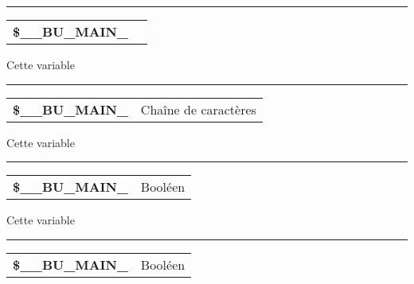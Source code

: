 \documentclass[a4paper,10pt]{article}
\begin{document}

\par\noindent\rule{\textwidth}{0.4pt}

\begin{justify}
    \begin{tabular}{l|l}
        \textbf{\color{vars}\$\_\_BU\_MAIN\_}   & \\[1\baselineskip]
    \end{tabular}
\end{justify}

\begin{justify}
    Cette variable
\end{justify}


\par\noindent\rule{\textwidth}{0.4pt}

\begin{justify}
    \begin{tabular}{l|l}
                \textbf{\color{vars}\$\_\_BU\_MAIN\_}  & Chaîne de caractères \\[1\baselineskip]
    \end{tabular}
\end{justify}

\begin{justify}
    Cette variable
\end{justify}


\par\noindent\rule{\textwidth}{0.4pt}

\begin{justify}
    \begin{tabular}{l|l}
        \textbf{\color{vars}\$\_\_BU\_MAIN\_}       & Booléen \\[1\baselineskip]
    \end{tabular}
\end{justify}

\begin{justify}
    Cette variable
\end{justify}


\par\noindent\rule{\textwidth}{0.4pt}

\begin{justify}
    \begin{tabular}{l|l}
        \textbf{\color{vars}\$\_\_BU\_MAIN\_}    & Booléen \\[1\baselineskip]
    \end{tabular}
\end{justify}
\end{document}
